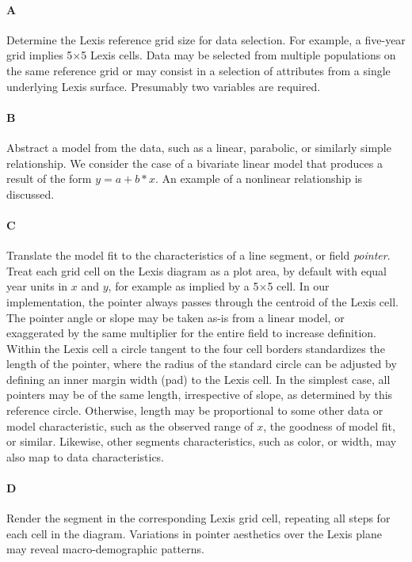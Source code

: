 \documentclass{article}
\begin{document}
\paragraph{\textbf{A}} Determine the Lexis reference grid size for data selection. For example, a five-year grid implies 5$\times$5 Lexis cells. Data may be selected from multiple populations on the same reference grid or may consist in a selection of attributes from a single underlying Lexis surface. Presumably two variables are required.
\paragraph{\textbf{B}} Abstract a model from the data, such as a linear, parabolic, or similarly simple relationship. We consider the case of a bivariate linear model that produces a result of the form $y = a + b*x$. An example of a nonlinear relationship is discussed. 
\paragraph{\textbf{C}} Translate the model fit to the characteristics of a line segment, or field \emph{pointer}. Treat each grid cell on the Lexis diagram as a plot area, by default with equal year units in $x$ and $y$, for example as implied by a 5$\times$5 cell. In our implementation, the pointer always passes through the centroid of the Lexis cell. The pointer angle or slope may be taken as-is from a linear model, or exaggerated by the same multiplier for the entire field to increase definition. Within the Lexis cell a circle tangent to the four cell borders standardizes the length of the pointer, where the radius of the standard circle can be adjusted by defining an inner margin width (pad) to the Lexis cell. In the simplest case, all pointers may be of the same length, irrespective of slope, as determined by this reference circle. Otherwise, length may be proportional to some other data or model characteristic, such as the observed range of $x$, the goodness of model fit, or similar. Likewise, other segments characteristics, such as color, or width, may also map to data characteristics.
\paragraph{\textbf{D}} Render the segment in the corresponding Lexis grid cell, repeating all steps for each cell in the diagram. Variations in pointer aesthetics over the Lexis plane may reveal macro-demographic patterns.
\end{document}
